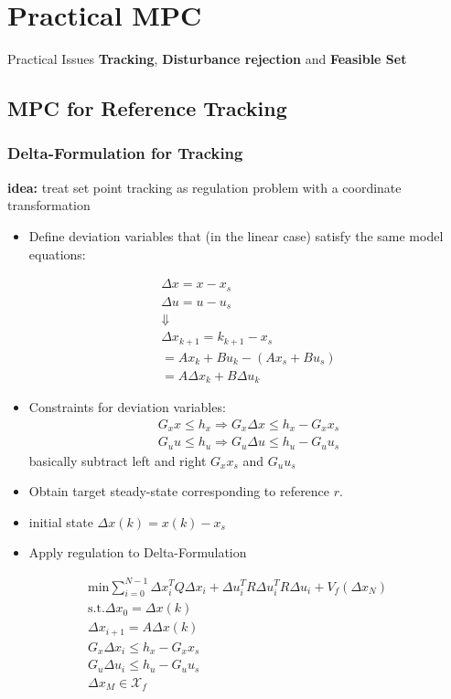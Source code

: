\section{Practical MPC}
Practical Issues \textbf{Tracking}, \textbf{Disturbance rejection} and \textbf{Feasible Set}
\subsection{MPC for Reference Tracking}
\subsubsection{Delta-Formulation for Tracking}
\textbf{idea:} treat set point tracking as regulation problem with a coordinate transformation
\begin{itemize}
    \item Define deviation variables that (in the linear case) satisfy the same model equations: 
    
    \begin{gather*}
        \Delta x = x-x_s\\ 
        \Delta u =u-u_s\\
        \Downarrow\\
        \Delta x_{k+1} = k_{k+1} -x_s \\
        = Ax_k + Bu_k - (Ax_s+Bu_s)\\
        = A \Delta x_k+ B \Delta u_k
    \end{gather*}
    \item Constraints for deviation variables: 
    \begin{gather*}
        G_xx\leq h_x \Rightarrow G_x\Delta x \leq h_x - G_x x_s \\
        G_uu\leq h_u \Rightarrow G_u \Delta u \leq h_u - G_u u_s 
    \end{gather*}
    basically subtract left and right $G_x x_s $ and $G_u u_s$
    \item Obtain target steady-state corresponding to reference $r$. 
    \item initial state $\Delta x(k) = x(k) - x_s$
    \item Apply regulation to Delta-Formulation
\end{itemize}
\begin{gather*}
    \mathrm{min} \sum^{N-1}_{i=0} \Delta x_i^T Q \Delta x_i + \Delta u_i^TR \Delta u_i^T R \Delta u_i + V_f (\Delta x_N)\\
    \mathrm{s.t.} \Delta x_0 = \Delta x(k)\\
    \Delta x_{i+1}= A \Delta x(k)\\
    G_x\Delta x_i \leq h_x -G_xx_s \\ 
    G_u \Delta u_i \leq h_u -G_u u_s \\
    \Delta x_M \in \mathcal{X}_f
\end{gather*}
